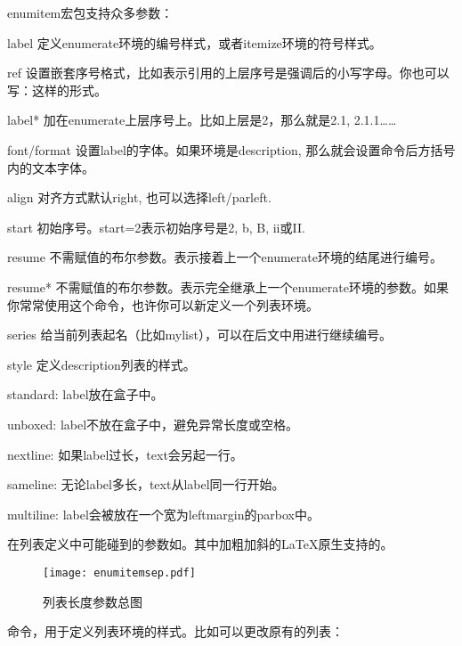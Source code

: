 enumitem宏包支持众多参数：
\begin{para}
\item[label] 定义enumerate环境的编号样式，或者itemize环境的符号样式。
\item[ref] 设置嵌套序号格式，比如\latexline{[ref=\\emph{\\alph*}]}表示引用的上层序号是强调后的小写字母。你也可以写：\latexline{[label=\alph{enumi}. \roman*]}这样的形式。
\item[label*] 加在enumerate上层序号上。比如上层是2，那么就是2.1, 2.1.1……
\item[font/format] 设置label的字体。如果环境是description, 那么就会设置\latexline{\\item}命令后方括号内的文本字体。
\item[align] 对齐方式默认right, 也可以选择left/parleft.
\item[start] 初始序号。start=2表示初始序号是2, b, B, ii或II.
\item[resume] 不需赋值的布尔参数。表示接着上一个enumerate环境的结尾进行编号。
\item[resume*] 不需赋值的布尔参数。表示完全继承上一个enumerate环境的参数。如果你常常使用这个命令，也许你可以新定义一个列表环境。
\item[series] 给当前列表起名（比如mylist），可以在后文中用进行继续编号。
\item[style] 定义description列表的样式。
\begin{para}
\item[standard:] label放在盒子中。
\item[unboxed:] label不放在盒子中，避免异常长度或空格。
\item[nextline:] 如果label过长，text会另起一行。
\item[sameline:] 无论label多长，text从label同一行开始。
\item[multiline:] label会被放在一个宽为leftmargin的parbox中。
\end{para}
\end{para}

在列表定义中可能碰到的参数如。其中加粗加斜的\LaTeX 原生支持的。
\begin{figure}[!hbt]
\texttt{[image: enumitemsep.pdf]}
\caption{列表长度参数总图}
\label{fig:enumitemsep}
\end{figure}

命令\latexline{\\setlist}，用于定义列表环境的样式。比如可以更改原有的列表：
\begin{latex}{}
\end{latex}

